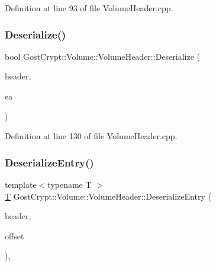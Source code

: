 Definition at line 93 of file Volume\+Header.\+cpp.

\mbox{\label{class_gost_crypt_1_1_volume_1_1_volume_header_a9352d16b503f35338e5f6d6deb12f455}} 
\subsubsection{\texorpdfstring{Deserialize()}{Deserialize()}}
{\footnotesize\ttfamily bool Gost\+Crypt\+::\+Volume\+::\+Volume\+Header\+::\+Deserialize (\begin{DoxyParamCaption}\item[{const \hyperlink{class_gost_crypt_1_1_buffer_ptr}{Buffer\+Ptr} \&}]{header,  }\item[{Q\+Shared\+Pointer$<$ \hyperlink{class_gost_crypt_1_1_volume_1_1_encryption_algorithm}{Encryption\+Algorithm} $>$ \&}]{ea }\end{DoxyParamCaption})\hspace{0.3cm}{\ttfamily [protected]}}



Definition at line 130 of file Volume\+Header.\+cpp.

\mbox{\label{class_gost_crypt_1_1_volume_1_1_volume_header_a20f60406a12c3e996005a4093c19e438}} 
\subsubsection{\texorpdfstring{Deserialize\+Entry()}{DeserializeEntry()}}
{\footnotesize\ttfamily template$<$typename T $>$ \\
\hyperlink{_stribog_8c_aba2f4c400d7a4c0bf0296be622087314}{T} Gost\+Crypt\+::\+Volume\+::\+Volume\+Header\+::\+Deserialize\+Entry (\begin{DoxyParamCaption}\item[{const \hyperlink{class_gost_crypt_1_1_buffer_ptr}{Buffer\+Ptr} \&}]{header,  }\item[{size\+\_\+t \&}]{offset }\end{DoxyParamCaption})\hspace{0.3cm}{\ttfamily [static]}, {\ttfamily [protected]}}



